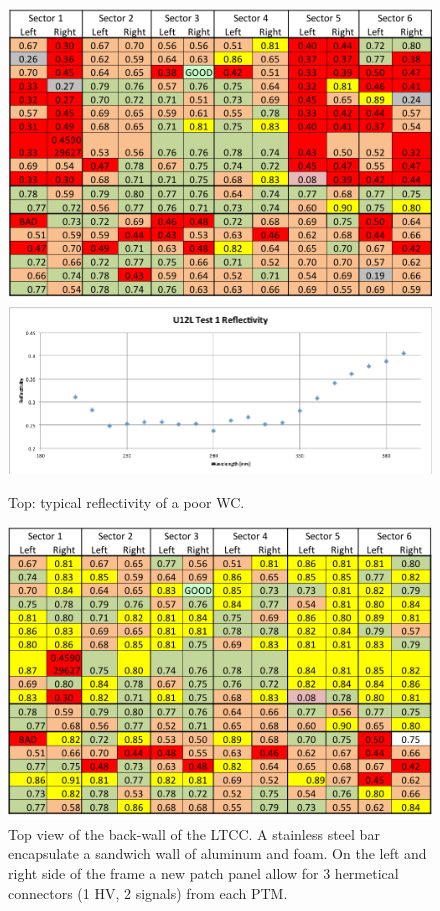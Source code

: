 \begin{figure}
	\centering
	\includegraphics[width=1.0\columnwidth,keepaspectratio]{img/wcStatusBefore.png}
	\includegraphics[width=1.0\columnwidth,keepaspectratio]{img/winstoConeSample2Reflectivity.png}
\caption{Top: typical reflectivity of a poor WC.  }
	\label{fig:wcStatusBefore}
\end{figure}


\begin{figure}
	\centering
	\includegraphics[width=1.0\columnwidth,keepaspectratio]{img/wcStatusAfter.png}
	\caption{Top view of the back-wall of the LTCC. A stainless steel bar encapsulate a sandwich wall of aluminum and foam. On the left and right side
			of the frame a new patch panel allow for 3 hermetical connectors (1 HV, 2 signals) from each PTM. }
	\label{fig:wcStatusAfter}
\end{figure}

